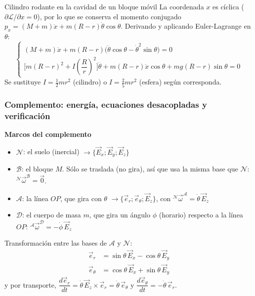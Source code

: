 \begin{solucion}{Cilindro rodante en la cavidad de un bloque móvil}
La coordenada $x$ es cíclica ($\partial\mathcal{L}/\partial x=0$), por lo que se conserva
el momento conjugado $p_x=(M+m)\dot{x}+m(R-r)\dot\theta\cos\theta$. Derivando y aplicando
Euler-Lagrange en $\theta$:
$$\boxed{\begin{cases}
(M+m)\ddot{x} + m(R-r)\big(\ddot\theta\cos\theta - \dot\theta^2\sin\theta\big) = 0 \\[4pt]
\Big[m(R-r)^2 + I\left(\dfrac{R}{r}\right)^2\Big]\ddot\theta + m(R-r)\ddot{x}\cos\theta
+ mg(R-r)\sin\theta = 0
\end{cases}}$$
Se sustituye $I=\tfrac12 mr^2$ (cilindro) o $I=\tfrac25 mr^2$ (esfera) según corresponda.

\subsubsection*{Complemento: energía, ecuaciones desacopladas y verificación}

\textbf{Marcos del complemento}
\begin{itemize}
    \item $\mathcal{N}$: el suelo (inercial) $\longrightarrow\{\vec{E}_x;\vec{E}_y;\vec{E}_z\}$
    \item $\mathcal{B}$: el bloque $M$. Sólo se traslada (no gira), así que usa la misma base que $\mathcal{N}$: ${}^{\mathcal N}\vec{\omega}^{\mathcal B}=\vec{0}$.
    \item $\mathcal{A}$: la línea $OP$, que gira con $\theta$ $\longrightarrow\{\vec{e}_r;\vec{e}_\theta;\vec{E}_z\}$, con ${}^{\mathcal N}\vec{\omega}^{\mathcal A}=\dot\theta\,\vec{E}_z$
    \item $\mathcal{D}$: el cuerpo de masa $m$, que gira un ángulo $\phi$ (horario) respecto a la línea $OP$: ${}^{\mathcal A}\vec{\omega}^{\mathcal D}=-\dot\phi\,\vec{E}_z$
\end{itemize}

Transformación entre las bases de $\mathcal{A}$ y $\mathcal{N}$:
\begin{equation*}
\begin{split}
\vec{e}_r &= \sin\theta\,\vec{E}_x - \cos\theta\,\vec{E}_y\\
\vec{e}_\theta &= \cos\theta\,\vec{E}_x + \sin\theta\,\vec{E}_y
\end{split}
\end{equation*}
y por transporte, $\dfrac{d\vec{e}_r}{dt}=\dot\theta\,\vec{E}_z\times\vec{e}_r=\dot\theta\,\vec{e}_\theta$ y $\dfrac{d\vec{e}_\theta}{dt}=-\dot\theta\,\vec{e}_r$.
 

\end{solucion}
